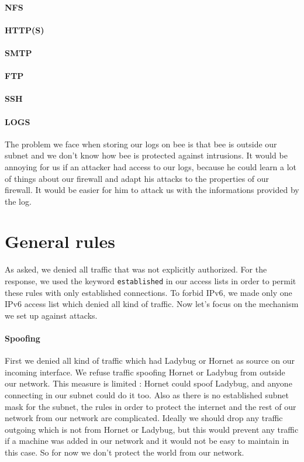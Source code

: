 \documentclass[a4paper,titlepage]{article}
\begin{document}
\paragraph{NFS}
\paragraph{HTTP(S)}
\paragraph{SMTP}
\paragraph{FTP}
\paragraph{SSH}
\paragraph{LOGS} The problem we face when storing our logs on bee is that bee is outside our subnet and we don't know how bee is protected against intrusions. It would be annoying for us if an attacker had access to our logs, because he could learn a lot of things about our firewall and adapt his attacks to the properties of our firewall. It would be easier for him to attack us with the informations provided by the log. 

\section{General rules}
As asked, we denied all traffic that was not explicitly authorized. For the response, we used the keyword \texttt{established} in our access lists in order to permit these rules with only established connections. To forbid IPv6, we made only one IPv6 access list which denied all kind of traffic. Now let's focus on the mechanism we set up against attacks.

\paragraph{Spoofing}
First we denied all kind of traffic which had Ladybug or Hornet as source on our incoming interface. We refuse traffic spoofing Hornet or Ladybug from outside our network. This measure is limited : Hornet could spoof Ladybug, and anyone connecting in our subnet could do it too. Also as there is no established subnet mask for the subnet, the rules in order to protect the internet and the rest of our network from our network are complicated. Ideally we should drop any traffic outgoing which is not from Hornet or Ladybug, but this would prevent any traffic if a machine was added in our network and it would not be easy to maintain in this case. So for now we don't protect the world from our network.
 
\end{document}
